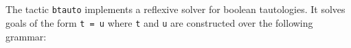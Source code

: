 






\subsection{}
\label{btauto}

The tactic \texttt{btauto} implements a reflexive solver for boolean tautologies. It
solves goals of the form {\tt t = u} where {\tt t} and {\tt u} are constructed
over the following grammar:

